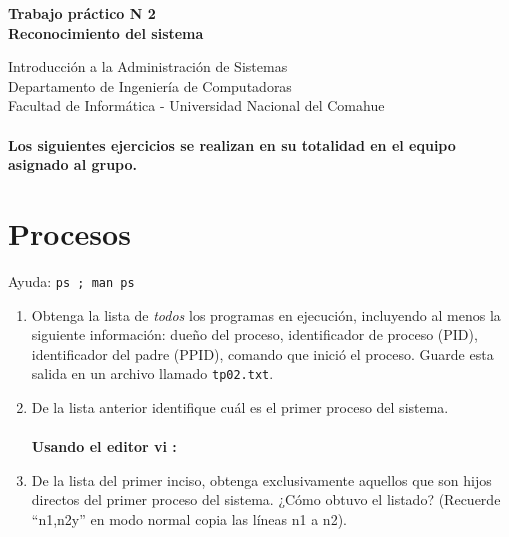 \documentclass[12pt]{article}
\def\maketitle{

 \makeatletter
 {\color{bl} \centering \huge \sc \textbf{
Trabajo práctico N 2 \\
\large \vspace*{-8pt} \color{black} Reconocimiento del sistema
 \vspace*{8pt} }\par}
 \makeatother


 \makeatletter
 {\centering \small 
	Introducción a la Administración de Sistemas \\
 	Departamento de Ingeniería de Computadoras \\
 	Facultad de Informática - Universidad Nacional del Comahue \\
 	\vspace{20pt} }
 \makeatother

}
\begin{document}
\thispagestyle{empty}
\maketitle
\setlength{\parindent}{0pt}

\paragraph{Los siguientes ejercicios se realizan en su totalidad en el equipo asignado al grupo. } 


\section*{Procesos}
Ayuda: \texttt{ps ; man ps}
\begin{enumerate}
\item Obtenga la lista de \textit{todos} los programas en ejecución, incluyendo al menos la siguiente información:
dueño del proceso, identificador de proceso (PID), identificador del padre (PPID),
comando que inició el proceso. Guarde esta salida en un archivo llamado \texttt{tp02.txt}.
\item De la lista anterior identifique cuál es el primer proceso del sistema. \\ \\
\textbf{Usando el editor vi :} 
\item De la lista del primer inciso, obtenga exclusivamente aquellos que son hijos directos del primer proceso del sistema. ¿Cómo obtuvo el listado? (Recuerde ``n1,n2y'' en modo normal copia las líneas n1 a n2).
\end{enumerate}
\end{document}

